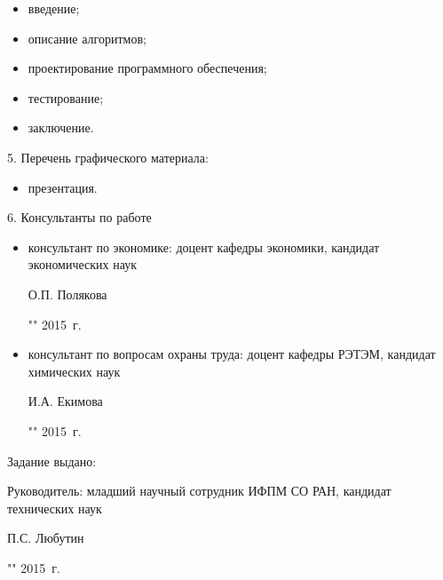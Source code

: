 \begin{itemize}
 \item введение;
 \item описание алгоритмов;
 \item проектирование программного обеспечения;
 \item тестирование;
 \item заключение.
\end{itemize}

5. Перечень графического материала:

\begin{itemize}
 \item презентация.
\end{itemize}

6. Консультанты по работе

\begin{itemize}
  \item консультант по экономике: доцент кафедры экономики, кандидат \\ экономических наук \\
  \begin{singlespace}
 О.П. Полякова\hfill \underline{\hspace{6cm}} \\
 \begin{flushright} "\underline{\hspace{1cm}}"\underline{\hspace{3cm}} 2015~г. \end{flushright}
 \end{singlespace}
 \item консультант по вопросам охраны труда: доцент кафедры РЭТЭМ, кандидат химических наук\\
 \begin{singlespace}
 И.А. Екимова \hfill \underline{\hspace{6cm}} \\
 \begin{flushright} "\underline{\hspace{1cm}}"\underline{\hspace{3cm}} 2015~г. \end{flushright}
 \end{singlespace}
\end{itemize}

Задание выдано:

Руководитель: младший научный сотрудник ИФПМ СО РАН, кандидат технических наук \\
\begin{singlespace}
П.С. Любутин \hfill \underline{\hspace{6cm}} \\
\begin{flushright} "\underline{\hspace{1cm}}"\underline{\hspace{3cm}} 2015~г. \end{flushright}
\end{singlespace}


